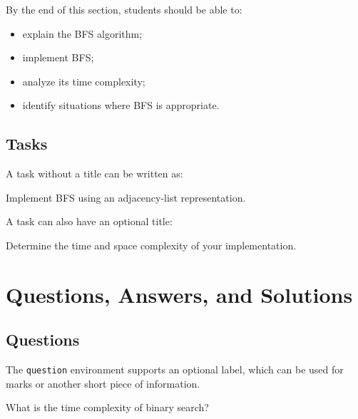 \documentclass{csdept}
\begin{document}
\begin{objective}

By the end of this section, students should be able to:

\begin{itemize}
    \item explain the BFS algorithm;
    \item implement BFS;
    \item analyze its time complexity;
    \item identify situations where BFS is appropriate.
\end{itemize}

\end{objective}

\subsection{Tasks}

A task without a title can be written as:

\begin{task}

Implement BFS using an adjacency-list representation.

\end{task}

A task can also have an optional title:

\begin{task}

Determine the time and space complexity of your implementation.

\end{task}

\section{Questions, Answers, and Solutions}

\subsection{Questions}

The \texttt{question} environment supports an optional label,
which can be used for marks or another short piece of information.

\begin{question}[2 points]

What is the time complexity of binary search?

\end{question}
\end{document}
